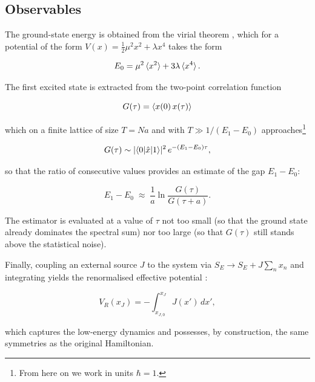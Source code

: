 \documentclass[11pt,a4paper,twoside,pdf]{article}
\numberwithin{equation}{section}
\begin{document}
\subsection{Observables}
\label{obs}

The ground-state energy is obtained from the virial theorem \cite{creutz1981statistical}, which for a potential of the form $V(x) = \frac12 \mu^2 x^2 + \lambda x^4$ takes the form

\begin{equation}
    E_0 = \mu^2 \braket{x^2} + 3\lambda \braket{x^4}.
    \label{virial}
\end{equation}

\medskip

The first excited state is extracted from the two-point correlation function

\begin{equation}
    G(\tau) = \braket{x(0)\, x(\tau)}
\end{equation}

which on a finite lattice of size $T = Na$ and with $T \gg 1/(E_1 - E_0)$ approaches\footnote{From here on we work in units $\hbar = 1$.}

\begin{equation}
    G(\tau) \sim |\!\braket{0|\hat{x}|1}\!|^2 \, e^{-(E_1 - E_0)\tau},
\end{equation}

so that the ratio of consecutive values provides an estimate of the gap $E_1 - E_0$:

\begin{equation}
    E_1 - E_0 \;\approx\; \frac{1}{a}\ln \frac{G(\tau)}{G(\tau + a)}.
    \label{E1mE0}
\end{equation}

The estimator is evaluated at a value of $\tau$ not too small (so that the ground state already dominates the spectral sum) nor too large (so that $G(\tau)$ still stands above the statistical noise).


Finally, coupling an external source $J$ to the system via $S_E \to S_E + J \sum_n x_n$ and integrating yields the renormalised effective potential \cite{creutz1981statistical}:

\begin{equation}
    V_R(x_J) = -\int_{x_{J,0}}^{x_J} J(x') \, dx',
    \label{VR}
\end{equation}

which captures the low-energy dynamics and possesses, by construction, the same symmetries as the original Hamiltonian.
\end{document}
